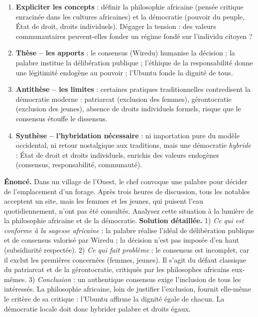 \documentclass[11pt]{article}
\newcounter{popsec}
\newcounter{popsub}
\newcommand{\courssub}[1]{%
  \stepcounter{popsub}%
  \par\vspace{9pt}\noindent{\popxbold\fontsize{11.5}{13}\selectfont\color{popink}{\color{poporange}\thepopsec.\thepopsub}\hspace{6pt}#1}\par\nopagebreak\vspace{4pt}
}
\begin{document}
\courssub{Méthode et entraînement à la dissertation}

\begin{methode}
\begin{enumerate}
\item \textbf{Expliciter les concepts} : définir la philosophie africaine (pensée critique enracinée dans les cultures africaines) et la démocratie (pouvoir du peuple, État de droit, droits individuels). Dégager la tension : des valeurs communautaires peuvent-elles fonder un régime fondé sur l'individu citoyen ?
\item \textbf{Thèse -- les apports} : le consensus (Wiredu) humanise la décision ; la palabre institue la délibération publique ; l'éthique de la responsabilité donne une légitimité endogène au pouvoir ; l'Ubuntu fonde la dignité de tous.
\item \textbf{Antithèse -- les limites} : certaines pratiques traditionnelles contredisent la démocratie moderne : patriarcat (exclusion des femmes), gérontocratie (exclusion des jeunes), absence de droits individuels formels, risque que le consensus étouffe le dissensus.
\item \textbf{Synthèse -- l'hybridation nécessaire} : ni importation pure du modèle occidental, ni retour nostalgique aux traditions, mais une démocratie \emph{hybride} : État de droit et droits individuels, enrichis des valeurs endogènes (consensus, responsabilité, communauté).
\end{enumerate}
\end{methode}

\begin{exoresolu}
\textbf{Énoncé.} Dans un village de l'Ouest, le chef convoque une palabre pour décider de l'emplacement d'un forage. Après trois heures de discussion, tous les notables acceptent un site, mais les femmes et les jeunes, qui puisent l'eau quotidiennement, n'ont pas été consultés. Analysez cette situation à la lumière de la philosophie africaine et de la démocratie.
\tcblower
\textbf{Solution détaillée.} 1) \emph{Ce qui est conforme à la sagesse africaine} : la palabre réalise l'idéal de délibération publique et de consensus valorisé par Wiredu ; la décision n'est pas imposée d'en haut (subsidiarité respectée). 2) \emph{Ce qui fait problème} : le consensus est incomplet, car il exclut les premières concernées (femmes, jeunes). Il s'agit du défaut classique du patriarcat et de la gérontocratie, critiqués par les philosophes africains eux-mêmes. 3) \emph{Conclusion} : un authentique consensus exige l'inclusion de tous les intéressés. La philosophie africaine, loin de justifier l'exclusion, fournit elle-même le critère de sa critique : l'Ubuntu affirme la dignité égale de chacun. La démocratie locale doit donc hybrider palabre et droits égaux.
\end{exoresolu}
\end{document}
